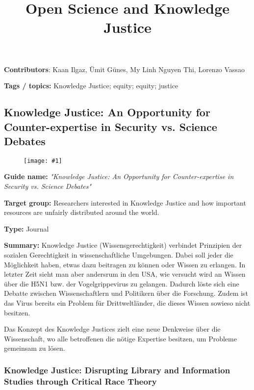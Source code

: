 \documentclass{article}
\newlength{\imgwidth}
\newcommand\scaledgraphics[2]{%
                
\settowidth{\imgwidth}{\texttt{[image: \#1]}}%
                
\setlength{\imgwidth}{\minof{\imgwidth}{#2\textwidth}}%
                
\texttt{[image: \#1]}%
                
}
\begin{document}
\title{Open Science and Knowledge Justice}

\maketitle


\textbf{Contributors}: Kaan Ilgaz, Ümit Günes, My Linh Nguyen Thi, Lorenzo Vassao


\textbf{Tags / topics:} Knowledge Justice; equity; equity; justice


\subsection{Knowledge Justice: An Opportunity for Counter-expertise in Security vs. Science Debates}\label{H870315}


\begin{figure}
\scaledgraphics{086e7cc2-fafd-4cc2-8c8f-018ac3a9884d.png}{1}
\label{F24704971}
\end{figure}


\textbf{Guide name:} \emph{"Knowledge Justice: An Opportunity for Counter-expertise in Security vs. Science Debates"} \autocite{r_egert_knowledge_2017}


\textbf{Target group: }Researchers interested in Knowledge Justice and how important resources are unfairly distributed around the world.


\textbf{Type:} Journal


\textbf{Summary: }Knowledge Justice (Wissensgerechtigkeit) verbindet Prinzipien der sozialen Gerechtigkeit in wissenschaftliche Umgebungen. Dabei soll jeder die Möglichkeit haben, etwas dazu beitragen zu können oder Wissen zu erlangen. In letzter Zeit sieht man aber andersrum in den USA, wie versucht wird an Wissen über die H5N1 bzw. der Vogelgrippevirus zu gelangen. Dadurch löste sich eine Debatte zwischen Wissenschaftlern und Politikern über die Forschung. Zudem ist das Virus bereits ein Problem für Drittweltländer, die dieses Wissen sowieso nicht besitzen.


Das Konzept des Knowledge Justices zielt eine neue Denkweise über die Wissenschaft, wo alle betroffenen die nötige Expertise besitzen, um Probleme gemeinsam zu lösen.


\subsubsection{Knowledge Justice: Disrupting Library and Information Studies through Critical Race Theory}\label{H8244312}
\end{document}
